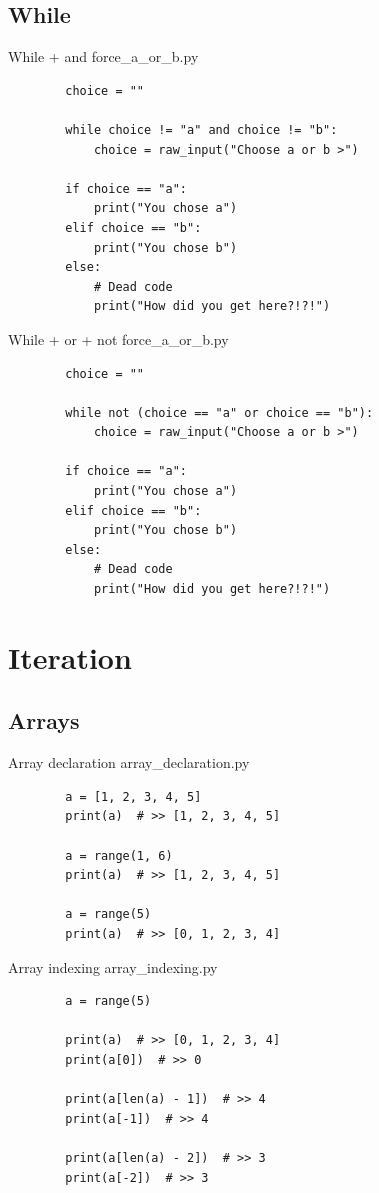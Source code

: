 \documentclass[11pt]{beamer}
\begin{document}
\subsection{While}
\begin{frame}[fragile]{While + and}
	force\_a\_or\_b.py
	\begin{lstlisting}
		choice = ""
		
		while choice != "a" and choice != "b":
			choice = raw_input("Choose a or b >")
		
		if choice == "a":
		    print("You chose a")
		elif choice == "b":
		    print("You chose b")
		else:
		    # Dead code
		    print("How did you get here?!?!")
	\end{lstlisting}
\end{frame}

\begin{frame}[fragile]{While + or + not}
	force\_a\_or\_b.py
	\begin{lstlisting}
		choice = ""
		
		while not (choice == "a" or choice == "b"):
			choice = raw_input("Choose a or b >")
		
		if choice == "a":
		    print("You chose a")
		elif choice == "b":
		    print("You chose b")
		else:
		    # Dead code
		    print("How did you get here?!?!")
	\end{lstlisting}
\end{frame}

\section{Iteration}
\subsection{Arrays}
\begin{frame}[fragile]{Array declaration}
	array\_declaration.py
	\begin{lstlisting}
		a = [1, 2, 3, 4, 5]
		print(a)  # >> [1, 2, 3, 4, 5]
		
		a = range(1, 6)
		print(a)  # >> [1, 2, 3, 4, 5]
		
		a = range(5)
		print(a)  # >> [0, 1, 2, 3, 4]
	\end{lstlisting}
\end{frame}

\begin{frame}[fragile]{Array indexing}
	array\_indexing.py
	\begin{lstlisting}
		a = range(5)
		
		print(a)  # >> [0, 1, 2, 3, 4]
		print(a[0])  # >> 0
		
		print(a[len(a) - 1])  # >> 4
		print(a[-1])  # >> 4
		
		print(a[len(a) - 2])  # >> 3
		print(a[-2])  # >> 3
	\end{lstlisting}
\end{frame}
\end{document}
